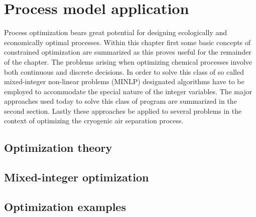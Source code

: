 \chapter{Process model application}
\label{chp:optimization}
Process optimization bears great potential for designing ecologically and economically optimal processes.
Within this chapter first some basic concepts of constrained optimization are summarized as this proves
useful for the remainder of the chapter. The problems arising when optimizing chemical processes involve
both continuous and discrete decisions. In order to solve this class of so called mixed-integer non-linear
problems (MINLP) designated algorithms have to be employed to accommodate the special nature of the integer
variables. The major approaches used today to solve this class of program  are summarized in the second section.
Lastly these approaches be applied to several problems in the context of optimizing the cryogenic air separation
process.

    \section{Optimization theory}
    \label{sec:opt:theory}
    

    \section{Mixed-integer optimization}
    \label{sec:opt:MINLP}
    

    \section{Optimization examples}
    \label{sec:opt:apllication}
    

